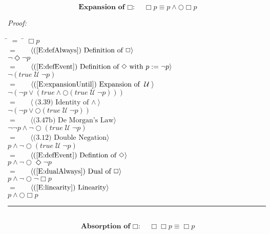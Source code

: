 \documentclass[fleqn, leqno]{article}
\newcommand{\lgap}{2pt}                             %
\newcommand{\mymathindent}{24pt}                      %
\newcommand{\Until}{\;\mathcal{U}\;}
\newcommand{\Next}{\bigcirc}
\newcommand{\Event}{\Diamond}
\newcommand{\Always}{\Box}
\newcommand{\myqed}{\hfill\rule[-.23ex]{1.2ex}{2.0ex}}
\newcommand{\Gll} {\langle}                         %
\newcommand{\Ggg} {\rangle}                         %
\newcommand{\Hint}[1]     {\ \ \ $\Gll              \mbox{#1} \Ggg$ }   %
\begin{document}
\begin{equation}\label{E:expansionAlways}
\textbf{Expansion of $\Always$:}\quad \Always p \equiv p \land \Next\Always p
\end{equation}

\emph{Proof:}
\begin{tabbing}
\hspace{\mymathindent} \= $= \;$ \= \kill
  \> \>   $\Always p$\\[\lgap]
  \> $=$  \>  \Hint{(\ref{E:defAlways}) Definition of $\Always$}\\[\lgap]
  \> \>   $\lnot\Event\lnot p$\\[\lgap]
  \> $=$  \>  \Hint{(\ref{E:defEvent}) Definition of $\Event$ with $p := \lnot p$}\\[\lgap]
  \> \>   $\lnot(true \Until \lnot p)$\\[\lgap]
  \> $=$  \>  \Hint{(\ref{E:expansionUntil}) Expansion of $\Until$}\\[\lgap]
  \> \>   $\lnot(\lnot p \lor (true \land \Next(true \Until \lnot p)))$\\[\lgap]
  \> $=$  \>  \Hint{(3.39) Identity of $\land$}\\[\lgap]
  \> \>   $\lnot(\lnot p \lor \Next(true \Until \lnot p))$\\[\lgap]
  \> $=$  \>  \Hint{(3.47b) De Morgan's Law}\\[\lgap]
  \> \>   $\lnot\lnot p \land \lnot\Next(true \Until \lnot p)$\\[\lgap]
  \> $=$  \>  \Hint{(3.12) Double Negation}\\[\lgap]
  \> \>   $p \land \lnot\Next(true \Until \lnot p)$\\[\lgap]
  \> $=$  \>  \Hint{(\ref{E:defEvent}) Defintion of $\Event$}\\[\lgap]
  \> \>   $p \land \lnot\Next\Event\lnot p$\\[\lgap]
  \> $=$  \>  \Hint{(\ref{E:dualAlways}) Dual of $\Always$}\\[\lgap]
  \> \>   $p \land \lnot\Next\lnot\Always p$\\[\lgap]
  \> $=$  \>  \Hint{(\ref{E:linearity}) Linearity}\\[\lgap]
  \> \>   $p \land \Next\Always p$\\[\lgap]
\end{tabbing}
\myqed\\[\lgap]


\begin{equation}\label{E:IdemAlways}
\textbf{Absorption of $\Always$:}\quad \Always\Always p \equiv \Always p
\end{equation}
\end{document}
